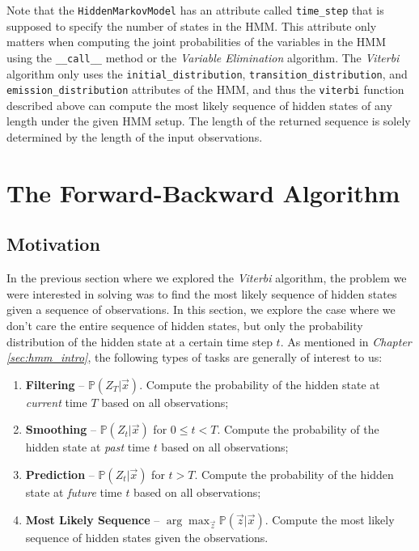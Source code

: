 \documentclass{article}
\theoremstyle{definition}
\renewcommand{\P}{\mathbb{P}}
\begin{document}
Note that the \texttt{HiddenMarkovModel} has an attribute called \texttt{time\_step} that is supposed to specify the number of states in the HMM. This attribute only matters when computing the joint probabilities of the variables in the HMM using the \texttt{\_\_call\_\_} method or the \textit{Variable Elimination} algorithm. The \textit{Viterbi} algorithm only uses the \texttt{initial\_distribution}, \texttt{transition\_distribution}, and \texttt{emission\_distribution} attributes of the HMM, and thus the \texttt{viterbi} function described above can compute the most likely sequence of hidden states of any length under the given HMM setup. The length of the returned sequence is solely determined by the length of the input observations.

\pagebreak

\section{The Forward-Backward Algorithm}

\subsection{Motivation}

In the previous section where we explored the \textit{Viterbi} algorithm, the problem we were interested in solving was to find the most likely sequence of hidden states given a sequence of observations. In this section, we explore the case where we don't care the entire sequence of hidden states, but only the probability distribution of the hidden state at a certain time step \(t\). As mentioned in \textit{Chapter \ref{sec:hmm_intro}}, the following types of tasks are generally of interest to us:

\begin{enumerate}
    \item \textbf{Filtering} -- \(\P(Z_T | \vec x)\). Compute the probability of the hidden state at \textit{current} time \(T\) based on all observations;
    \item \textbf{Smoothing} -- \(\P(Z_t | \vec x)\) for \(0 \leq t < T\). Compute the probability of the hidden state at \textit{past} time \(t\) based on all observations;
    \item \textbf{Prediction} -- \(\P(Z_t | \vec x)\) for \(t > T\). Compute the probability of the hidden state at \textit{future} time \(t\) based on all observations;
    \item \textbf{Most Likely Sequence} -- \(\arg \max_{\vec z} \P(\vec z | \vec x)\). Compute the most likely sequence of hidden states given the observations.
\end{enumerate}
\end{document}
